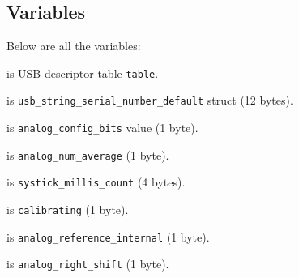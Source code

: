 \subsection{Variables}

Below are all the variables:

\vspace{1em}

 is USB descriptor table \texttt{table}.

 is {\tiny
\texttt{usb\_string\_serial\_number\_default}} struct (12 bytes).

 is \texttt{analog\_config\_bits} value (1 byte).

 is \texttt{analog\_num\_average} (1 byte).

 is \texttt{systick\_millis\_count} (4 bytes).

 is \texttt{calibrating} (1 byte).

 is \texttt{analog\_reference\_internal} (1 byte).

 is \texttt{analog\_right\_shift} (1 byte).

